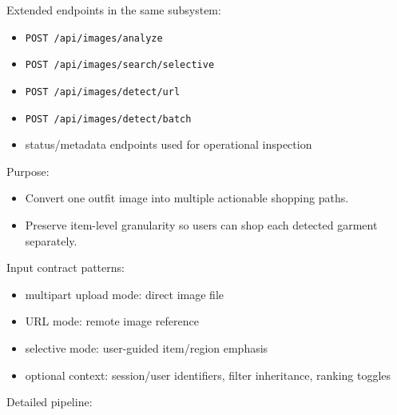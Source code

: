 \documentclass[12pt,a4paper]{report}
\begin{document}
Extended endpoints in the same subsystem:

\begin{itemize}
\item \texttt{POST /api/images/analyze}
\item \texttt{POST /api/images/search/selective}
\item \texttt{POST /api/images/detect/url}
\item \texttt{POST /api/images/detect/batch}
\item status/metadata endpoints used for operational inspection
\end{itemize}

Purpose:

\begin{itemize}
\item Convert one outfit image into multiple actionable shopping paths.
\item Preserve item-level granularity so users can shop each detected garment separately.
\end{itemize}

Input contract patterns:

\begin{itemize}
\item multipart upload mode: direct image file
\item URL mode: remote image reference
\item selective mode: user-guided item/region emphasis
\item optional context: session/user identifiers, filter inheritance, ranking toggles
\end{itemize}

Detailed pipeline:
\end{document}
